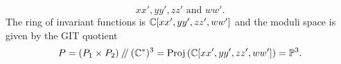 	\begin{equation}
		xx', yy', zz' \text{ and } ww'.
	\end{equation}
	The ring of invariant functions is $\mathbb{C}[xx',yy',zz',ww']$ and the moduli space is given by the GIT quotient
	\begin{equation}
		P = (P_1 \times P_2)\mathbin{/\mkern-4mu/} (\mathbb{C}^\ast)^3 = \text{Proj} \left(\mathbb{C}[xx',yy',zz',ww']\right) = \mathbb{P}^3.
	\end{equation}